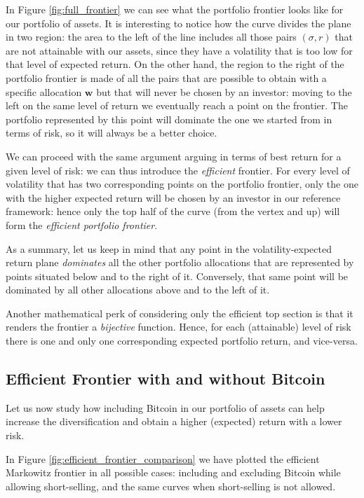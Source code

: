 In Figure \ref{fig:full_frontier} we can see what the portfolio frontier looks like for our portfolio of assets. 
It is interesting to notice how the curve divides the plane in two region: the area to the left of the line includes all those pairs $(\sigma, r)$ that are not attainable with our assets, since they have a volatility that is too low for that level of expected return. On the other hand, the region to the right of the portfolio frontier is made of all the pairs that are possible to obtain with a specific allocation $\mathbf{w}$ but that will never be chosen by an investor: moving to the left on the same level of return we eventually reach a point on the frontier. The portfolio represented by this point will dominate the one we started from in terms of risk, so it will always be a better choice.

We can proceed with the same argument arguing in terms of best return for a given level of risk: we can thus introduce the \textit{efficient} frontier. For every level of volatility that has two corresponding points on the portfolio frontier, only the one with the higher expected return will be chosen by an investor in our reference framework: hence only the top half of the curve (from the vertex and up) will form the \textit{efficient portfolio frontier}.

As a summary, let us keep in mind that any point in the volatility-expected return plane \textit{dominates} all the other portfolio allocations that are represented by points situated below and to the right of it. Conversely, that same point will be dominated by all other allocations above and to the left of it. 

Another mathematical perk of considering only the efficient top section is that it renders the frontier a \textit{bijective} function. Hence, for each (attainable) level of risk there is one and only one corresponding expected portfolio return, and vice-versa.


\subsection{Efficient Frontier with and without Bitcoin}

Let us now study how including Bitcoin in our portfolio of assets can help increase the diversification and obtain a higher (expected) return with a lower risk.

In Figure \ref{fig:efficient_frontier_comparison} we have plotted the efficient Markowitz frontier in all possible cases: including and excluding Bitcoin while allowing short-selling, and the same curves when short-selling is not allowed.

